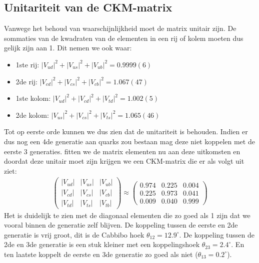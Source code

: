 \documentclass[../main.tex]{subfiles}
\begin{document}
\subsection{Unitariteit van de CKM-matrix}%
\label{sub:unitariteit_van_de_ckm_matrix}

Vanwege het behoud van waarschijnlijkheid moet de matrix unitair zijn. De sommaties van de kwadraten van de elementen in een rij of kolem moeten dus gelijk zijn aan 1. Dit nemen we ook waar:
\begin{itemize}
    \item 1ste rij: $\left|V_{u d}\right|^{2}+\left|V_{u s}\right|^{2}+\left|V_{u b}\right|^{2}=0.9999(6)$
    \item 2de rij: $\left|V_{c d}\right|^{2}+\left|V_{c s}\right|^{2}+\left|V_{c b}\right|^{2}=1.067(47)$
    \item 1ste kolom: $\left|V_{u d}\right|^{2}+\left|V_{c d}\right|^{2}+\left|V_{t d}\right|^{2}=1.002(5)$
    \item 2de kolom: $\left|V_{u s}\right|^{2}+\left|V_{c s}\right|^{2}+\left|V_{t s}\right|^{2}=1.065(46)$
\end{itemize}
Tot op eerste orde kunnen we dus zien dat de unitariteit is behouden. Indien er dus nog een 4de generatie aan quarks zou bestaan mag deze niet koppelen met de eerste 3 generaties. fitten we de matrix elementen nu aan deze uitkomsten en doordat deze unitair moet zijn krijgen we een CKM-matrix die er als volgt uit ziet:
\begin{equation}
    \begin{aligned}
        \label{eq:ckm_huidig}
        \left(\begin{array}{ccc}
                \left|V_{u d}\right| & \left|V_{u s}\right| & \left|V_{u b}\right| \\
                \left|V_{c d}\right| & \left|V_{c s}\right| & \left|V_{c b}\right| \\
                \left|V_{t d}\right| & \left|V_{t s}\right| & \left|V_{t b}\right|
                \end{array}\right) \approx\left(\begin{array}{ccc}
                0.974 & 0.225 & 0.004 \\
                0.225 & 0.973 & 0.041 \\
                0.009 & 0.040 & 0.999
        \end{array}\right)
    \end{aligned}
\end{equation}
Het is duidelijk te zien met de diagonaal elementen die zo goed als 1 zijn dat we vooral binnen de generatie zelf blijven. De koppeling tussen de eerste en 2de generatie is vrij groot, dit is de Cabbibo hoek $\theta_{12} = 12.9^\circ$. De koppeling tussen de 2de en 3de generatie is een stuk kleiner met een koppelingshoek $\theta_{23} = 2.4^\circ$. En ten laatste koppelt de eerste en 3de generatie zo goed als niet ($\theta_{13} = 0.2^\circ$).
\end{document}

